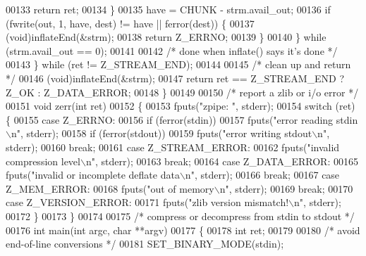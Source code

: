 \begin{DoxyCode}
00133                 \textcolor{keywordflow}{return} ret;
00134             \}
00135             have = CHUNK - strm.avail\_out;
00136             \textcolor{keywordflow}{if} (fwrite(out, 1, have, dest) != have || ferror(dest)) \{
00137                 (void)inflateEnd(&strm);
00138                 \textcolor{keywordflow}{return} Z\_ERRNO;
00139             \}
00140         \} \textcolor{keywordflow}{while} (strm.avail\_out == 0);
00141 
00142         \textcolor{comment}{/* done when inflate() says it's done */}
00143     \} \textcolor{keywordflow}{while} (ret != Z\_STREAM\_END);
00144 
00145     \textcolor{comment}{/* clean up and return */}
00146     (void)inflateEnd(&strm);
00147     \textcolor{keywordflow}{return} ret == Z\_STREAM\_END ? Z\_OK : Z\_DATA\_ERROR;
00148 \}
00149 
00150 \textcolor{comment}{/* report a zlib or i/o error */}
00151 \textcolor{keywordtype}{void} zerr(\textcolor{keywordtype}{int} ret)
00152 \{
00153     fputs(\textcolor{stringliteral}{"zpipe: "}, stderr);
00154     \textcolor{keywordflow}{switch} (ret) \{
00155     \textcolor{keywordflow}{case} Z\_ERRNO:
00156         \textcolor{keywordflow}{if} (ferror(stdin))
00157             fputs(\textcolor{stringliteral}{"error reading stdin\(\backslash\)n"}, stderr);
00158         \textcolor{keywordflow}{if} (ferror(stdout))
00159             fputs(\textcolor{stringliteral}{"error writing stdout\(\backslash\)n"}, stderr);
00160         \textcolor{keywordflow}{break};
00161     \textcolor{keywordflow}{case} Z\_STREAM\_ERROR:
00162         fputs(\textcolor{stringliteral}{"invalid compression level\(\backslash\)n"}, stderr);
00163         \textcolor{keywordflow}{break};
00164     \textcolor{keywordflow}{case} Z\_DATA\_ERROR:
00165         fputs(\textcolor{stringliteral}{"invalid or incomplete deflate data\(\backslash\)n"}, stderr);
00166         \textcolor{keywordflow}{break};
00167     \textcolor{keywordflow}{case} Z\_MEM\_ERROR:
00168         fputs(\textcolor{stringliteral}{"out of memory\(\backslash\)n"}, stderr);
00169         \textcolor{keywordflow}{break};
00170     \textcolor{keywordflow}{case} Z\_VERSION\_ERROR:
00171         fputs(\textcolor{stringliteral}{"zlib version mismatch!\(\backslash\)n"}, stderr);
00172     \}
00173 \}
00174 
00175 \textcolor{comment}{/* compress or decompress from stdin to stdout */}
00176 \textcolor{keywordtype}{int} main(\textcolor{keywordtype}{int} argc, \textcolor{keywordtype}{char} **argv)
00177 \{
00178     \textcolor{keywordtype}{int} ret;
00179 
00180     \textcolor{comment}{/* avoid end-of-line conversions */}
00181     SET\_BINARY\_MODE(stdin);

\end{DoxyCode}
